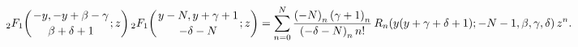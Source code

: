 \[\mathop{{{}_{2}F_{1}}\/}\nolimits\!\left({-y,-y+\beta-\gamma\atop\beta+\delta+%
1};z\right)\mathop{{{}_{2}F_{1}}\/}\nolimits\!\left({y-N,y+\gamma+1\atop-%
\delta-N};z\right)=\sum_{n=0}^{N}\frac{\left(-N\right)_{n}\left(\gamma+1\right%
)_{n}}{\left(-\delta-N\right)_{n}n!}\mathop{R_{n}\/}\nolimits\!\left(y(y+%
\gamma+\delta+1);-N-1,\beta,\gamma,\delta\right)z^{n}.\]